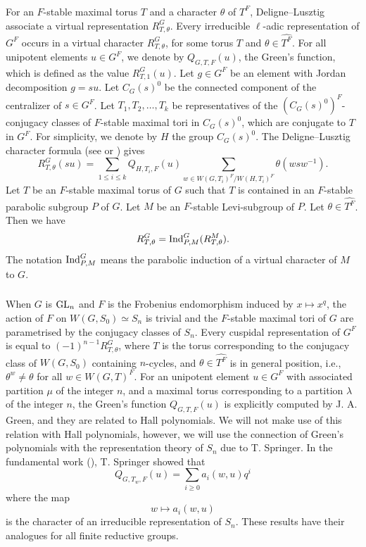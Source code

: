 \documentclass[10pt, reqno]{amsart}
\theoremstyle{plain}
\numberwithin{equation}{section} \newcommand{\di}{\operatorname{dim}}
\begin{document}
\subsubsection{}
For an $F$-stable maximal torus $T$ and a character $\theta$ of $T^F$,
Deligne--Lusztig associate a virtual representation $R^G_{T,
  \theta}$. Every irreducible $\ell$-adic representation of $G^F$
occurs in a virtual character $R^G_{T, \theta}$, for some torus $T$
and $\theta\in \widehat{T^F}$.  For all unipotent elements $u\in G^F$,
we denote by $Q_{G, T, F}(u)$, the Green's function, which is defined
as the value $R^G_{T, 1}(u)$.  Let $g\in G^F$ be an element with
Jordan decomposition $g=su$. Let $C_G(s)^0$ be the connected component
of the centralizer of $s\in G^F$. Let $T_1,T_2,\dots, T_k$ be
representatives of the $(C_G(s)^0)^F$-conjugacy classes of $F$-stable
maximal tori in $C_G(s)^0$, which are conjugate to $T$ in $G^F$. For
simplicity, we denote by $H$ the group $C_G(s)^0$.  
The Deligne--Lusztig character formula 
(see \cite[Theorem 4.2]{Deligne_Luszting_paper}
or \cite[Lemma 2.2.23, Chapter 2]{Malle_Geck_characters})
gives
\begin{equation}\label{DL_char_form_1}
R_{T, \theta}^G(su)=\sum_{1\leq i\leq k}Q_{H, T_i, F}(u)\sum_{w\in W(G,
T_i)^F/W(H, T_i)^F}\theta(wsw^{-1}).
\end{equation}
Let $T$ be an $F$-stable maximal torus of $G$ such that $T$ is
contained in an $F$-stable parabolic subgroup $P$ of $G$. Let $M$ be
an $F$-stable Levi-subgroup of $P$. Let $\theta\in
\widehat{T^F}$. Then we have
\begin{equation}
R_{T, \theta}^G={\rm Ind}_{P, M}^G
(R^M_{T, \theta}). 
\end{equation}
The notation ${\rm Ind}_{P,M}^G$ means the parabolic induction of a
virtual character of $M$ to $G$. 
\subsubsection{}
When $G$ is ${\rm GL}_n$ and $F$ is the Frobenius
endomorphism induced by
$x\mapsto x^q$, the action of $F$ on $W(G, S_0)\simeq S_n$ is trivial
and the $F$-stable maximal tori of $G$ are parametrised by the conjugacy classes of
$S_n$.  Every cuspidal representation of $G^F$ is equal to
$(-1)^{n-1}R_{T, \theta}^G$, where $T$ is the torus corresponding to the
conjugacy class of $W(G, S_0)$ containing $n$-cycles, and
$\theta\in \widehat{T^F}$ is in general position, i.e.,
$\theta^w\neq \theta$ for all $w\in W(G, T)^F$. For an unipotent
element $u\in G^F$ with associated partition $\mu$ of the integer
$n$, and a maximal torus corresponding to a partition $\lambda$ of the
integer $n$, the Green's function $Q_{G, T, F}(u)$ is explicitly
computed by J. A. Green, and they are related to Hall polynomials. We
will not make use of this relation with Hall polynomials, however, we
will use the connection of Green's polynomials with the representation
theory of $S_n$ due to T. Springer. 
In the fundamental work (\cite[Theorem 7.8]{TA_Springer}), 
T. Springer showed that
$$Q_{G, T_w, F}(u)=\sum_{i\geq 0}a_i(w, u)q^i$$
where the map
$$w\mapsto a_i(w, u)$$
is the character of an irreducible representation of $S_n$. 
These results have their analogues for all finite reductive groups. 
\end{document}
